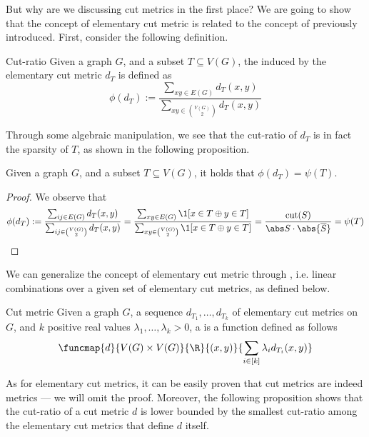 \documentclass[a4paper, 12pt]{report}
\begin{document}
    But why are we discussing cut metrics in the first place? We are going to show that the concept of elementary cut metric is  related to the concept of  previously introduced. First, consider the following definition.

    \begin{frameddefn}{Cut-ratio}
        Given a graph $G$, and a subset $T \subseteq V(G)$, the  induced by the elementary cut metric $d_T$ is defined as $$\phi(d_T) := \dfrac{\sum_{xy \in E(G)}{d_T(x, y)}}{\sum_{xy \in \binom{V(G)}{2}}{d_T(x, y)}}$$
    \end{frameddefn}

    Through some algebraic manipulation, we see that the cut-ratio of $d_T$ is in fact the sparsity of $T$, as shown in the following proposition.

    \begin{framedprop}[label={sparse prop}]{}
        Given a graph $G$, and a subset $T \subseteq V(G)$, it holds that $\phi(d_T) = \psi(T)$.
    \end{framedprop}
    
    \begin{proof}
        We observe that $$\phi(d_T) := \dfrac{\sum_{ij \in E(G)}{d_T(x, y)}}{\sum_{ij \in \binom{V(G)}{2}}{d_T(x, y)}} = \dfrac{\sum_{xy \in E(G)}{\1[x \in T \oplus y \in T]}}{\sum_{xy \in \binom{V(G)}{2}}{\1[x \in T \oplus y \in T]}} = \dfrac{\mathrm{cut}(S)}{\abs S \cdot \abs{\overline S}} = \psi(T)$$
    \end{proof}

    We can generalize the concept of elementary cut metric through , i.e. linear combinations over a given set of elementary cut metrics, as defined below.

    \begin{frameddefn}{Cut metric}
        Given a graph $G$, a sequence $d_{T_1}, \ldots, d_{T_k}$ of elementary cut metrics on $G$, and $k$ positive real values $\lambda_1, \ldots, \lambda_k > 0$, a  is a function defined as follows $$\funcmap{d}{V(G) \times V(G)}{\R}{(x, y)}{\sum_{i \in [k]}{\lambda_i d_{T_i}(x, y)}}$$
    \end{frameddefn}

    As for elementary cut metrics, it can be easily proven that cut metrics are indeed metrics --- we will omit the proof. Moreover, the following proposition shows that the cut-ratio of a cut metric $d$ is lower bounded by the smallest cut-ratio among the elementary cut metrics that define $d$ itself.
\end{document}
